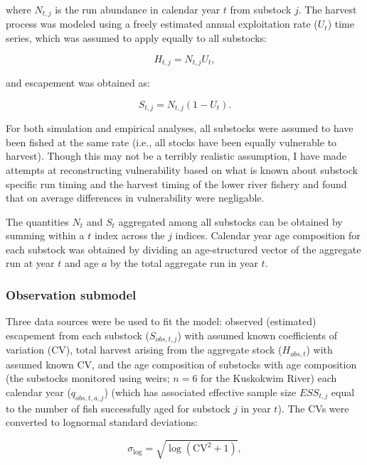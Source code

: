 \documentclass[12pt,]{book}
\theoremstyle{definition}
\theoremstyle{definition}
\theoremstyle{definition}
\theoremstyle{remark}
\begin{document}
\noindent
where \(N_{t,j}\) is the run abundance in calendar year \(t\) from
substock \(j\). The harvest process was modeled using a freely estimated
annual exploitation rate (\(U_t\)) time series, which was assumed to
apply equally to all substocks:

\begin{equation}
  H_{t,j}=N_{t,j} U_t,
  \label{eq:tsm-get-H}
\end{equation}

\noindent
and escapement was obtained as:

\begin{equation}
  S_{t,j}=N_{t,j} (1 - U_t).
  \label{eq:tsm-get-S}
\end{equation}

\noindent
For both simulation and empirical analyses, all substocks were assumed
to have been fished at the same rate (i.e., all stocks have been equally
vulnerable to harvest). Though this may not be a terribly realistic
assumption, I have made attempts at reconstructing vulnerability based
on what is known about substock specific run timing and the harvest
timing of the lower river fishery and found that on average differences
in vulnerability were negligable.

The quantities \(N_t\) and \(S_t\) aggregated among all substocks can be
obtained by summing within a \(t\) index across the \(j\) indices.
Calendar year age composition for each substock was obtained by dividing
an age-structured vector of the aggregate run at year \(t\) and age
\(a\) by the total aggregate run in year \(t\).

\subsubsection{Observation submodel}\label{ssm-obs-model}

\noindent
Three data sources were be used to fit the model: observed (estimated)
escapement from each substock (\(S_{obs,t,j}\)) with assumed known
coefficients of variation (CV), total harvest arising from the aggregate
stock (\(H_{obs,t}\)) with assumed known CV, and the age composition of
substocks with age composition (the substocks monitored using weirs;
\(n = 6\) for the Kuskokwim River) each calendar year
(\(q_{obs,t,a,j}\)) (which has associated effective sample size
\(ESS_{t,j}\) equal to the number of fish successfully aged for substock
\(j\) in year \(t\)). The CVs were converted to lognormal standard
deviations:

\begin{equation}
  \sigma_{\text{log}}=\sqrt{\log(\text{CV}^2+1)},
  \label{eq:cv2sig}
\end{equation}
\end{document}
